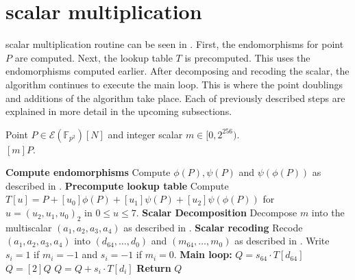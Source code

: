 \section{\texorpdfstring{{\fourqs} scalar multiplication}{FourQ's scalar multiplication}} \label{sec: FourQ's scalar multiplication}
{\fourqs} scalar multiplication routine can be seen in .
First, the endomorphisms for point $P$ are computed.
Next, the lookup table $T$ is precomputed.
This uses the endomorphisms computed earlier.
After decomposing and recoding the scalar, the algorithm continues to execute the main loop.
This is where the point doublings and additions of the algorithm take place.
Each of previously described steps are explained in more detail in the upcoming subsections.
%
\begin{algorithm}
	\algorithmicrequire Point $P \in \mathcal{E}(\mathbb{F}_{p^2}) \left[ N \right]$ and integer scalar $m \in [0, 2^{256})$.\\
	\algorithmicensure $[m]P$.
	\begin{algorithmic}[1]
		\Statex \textbf{Compute endomorphisms}
		\State Compute $\phi(P), \psi(P)$ and $\psi(\phi(P))$ as described in .
		\Statex \textbf{Precompute lookup table}
		\State Compute $T[u] = P + [u_0] \phi(P) + [u_1] \psi(P) + [u_2] \psi(\phi(P))$ for $u = (u_2, u_1, u_0)_2$ in $0 \le u \le 7$. \label{lst:fourq_scalar_mult:precompute table}
		\Statex \textbf{Scalar Decomposition}
		\State Decompose $m$ into the multiscalar $(a_1, a_2, a_3, a_4)$ as described in .
		\Statex \textbf{Scalar recoding}
		\State Recode $(a_1, a_2, a_3, a_4)$ into $(d_{64}, \ldots , d_0)$ and $(m_{64}, \ldots, m_0)$ as described in . Write $s_i = 1$ if $m_i = -1$ and $s_i = -1$ if $m_i = 0$.
		\Statex \textbf{Main loop:}
		\State $Q = s_{64} \cdot T[d_{64}]$ \label{lst:fourq scalar mult:initial assignment}
			\State $Q = [2]Q$				\label{lst:fourq scalar mult:double oper}
			\State $Q = Q + s_i \cdot T[d_i]$ \label{lst:fourq scalar mult:add oper}
		\EndFor
		\State \textbf{Return} $Q$
	\end{algorithmic}
	\label{algo: FourQ's scalar multiplication}
\end{algorithm}
%




